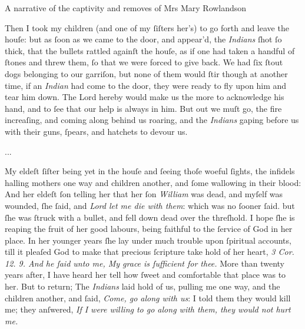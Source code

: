 \begin{texts}{A narrative of the captivity and removes of Mrs Mary Rowlandson}
\begin{textglossed}
    Then I took my children (and one of my ſiſters her's) to go forth and leave the houſe: but as ſoon as we came to the door, and appear'd, the \emph{Indians} ſhot ſo thick, that the bullets rattled againſt the houſe, as if one had taken a handful of ſtones and threw them, ſo that we were forced to give back. We had ſix ſtout dogs belonging to our garriſon, but none of them would ſtir though at another time, if an \emph{Indian} had come to the door, they were ready to fly upon him and tear him down. The Lord hereby would make us the more to acknowledge his hand, and to ſee that our help is always in him. But out we muſt go, the fire increaſing, and coming along behind us roaring, and the \emph{Indians} gaping before us with their guns, ſpears, and hatchets to devour us.

    ...
    
    My eldeſt ſiſter being yet in the houſe and ſeeing thoſe woeful ſights, the infidels halling mothers one way and children another, and ſome wallowing in their blood: And her eldeſt ſon telling her that her ſon \emph{William} was dead, and myſelf was wounded, ſhe ſaid, and \emph{Lord let me die with them}: which was no ſooner ſaid. but ſhe was ſtruck with a bullet, and fell down dead over the threſhold. I hope ſhe is reaping the fruit of her good labours, being faithful to the ſervice of God in her place. In her younger years ſhe lay under much trouble upon ſpiritual accounts, till it pleaſed God to make that precious ſcripture take hold of her heart, \emph{3 Cor. 12. 9. And he ſaid unto me, My grace is ſufficient for thee.} More than twenty years after, I have heard her tell how ſweet and comfortable that place was to her. But to return; The \emph{Indians} laid hold of us, pulling me one way, and the children another, and ſaid, \emph{Come, go along with us}: I told them they would kill me; they anſwered, \emph{If I were willing to go along with them, they would not hurt me.}
\end{textglossed}


\end{texts}

